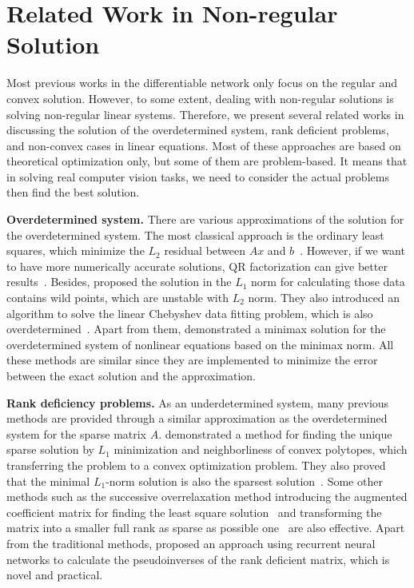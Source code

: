 \section{Related Work in Non-regular Solution}
\label{sec:relatedworknonreg}
Most previous works in the differentiable network only focus on the regular and convex solution. However, to some extent, dealing with non-regular solutions is solving non-regular linear systems. Therefore, we present several related works in discussing the solution of the overdetermined system, rank deficient problems, and non-convex cases in linear equations. Most of these approaches are based on theoretical optimization only, but some of them are problem-based. It means that in solving real computer vision tasks, we need to consider the actual problems then find the best solution. 
\par \textbf{Overdetermined system.} There are various approximations of the solution for the overdetermined system. The most classical approach is the ordinary least squares, which minimize the $L_2$ residual between $Ax$ and $b$~\citep{AH:13}. However, if we want to have more numerically accurate solutions, QR factorization can give better results~\citep{TL:97}. Besides, \cite{BI:74} proposed the solution in the $L_1$ norm for calculating those data contains wild points, which are unstable with $L_2$ norm. They also introduced an algorithm to solve the linear Chebyshev data fitting problem, which is also overdetermined~\citep{BI:75}. Apart from them, \cite{WG:79} demonstrated a minimax solution for the overdetermined system of nonlinear equations based on the minimax norm. All these methods are similar since they are implemented to minimize the error between the exact solution and the approximation. 
\par \textbf{Rank deficiency problems.} As an underdetermined system, many previous methods are provided through a similar approximation as the overdetermined system for the sparse matrix $A$. \cite{DD:05} demonstrated a method for finding the unique sparse solution by $L_1$ minimization and neighborliness of convex polytopes, which transferring the problem to a convex optimization problem. They also proved that the minimal $L_1$-norm solution is also the sparsest solution~\citep{DD:06}. Some other methods such as the successive overrelaxation method introducing the augmented coefficient matrix for finding the least square solution~\citep{DM:06} and transforming the matrix into a smaller full rank as sparse as possible one~\citep{WX:04} are also effective. Apart from the traditional methods, \cite{WJ:97} proposed an approach using recurrent neural networks to calculate the pseudoinverses of the rank deficient matrix, which is novel and practical. 
